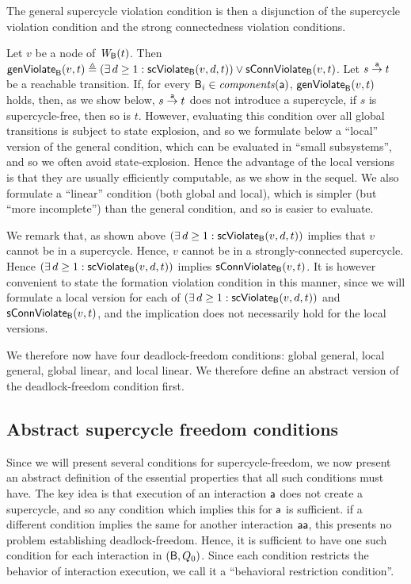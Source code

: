 The general supercycle violation condition is then a disjunction of the supercycle violation condition
and the strong connectedness violation conditions.


\label{def:formation.violation} 
\label{defn:formation.violation} 
Let $v$ be a node of $\wfg{\B}{t}$.
Then $\genViol{v}{t}  \df (\exs d \ge 1: \scViol{v}{d}{t}) \lor \connViol{v}{t}$.
\ed
%
Let $s \goesto[\act] t$ be a reachable transition. If, for every $\B_i \in \cmps{\act}$,
$\formViol{v}{t}$ holds, then, as we show below, $s \goesto[\act] t$ does not introduce a
supercycle, \ie if $s$ is supercycle-free, then so is $t$.  However, evaluating this condition over
all global transitions is subject to state explosion, and so we formulate below a ``local'' version
of the general condition, which can be evaluated in ``small subsystems'', and so we often avoid
state-explosion. Hence the advantage of the local versions is that they are usually efficiently
computable, as we show in the sequel.  We also formulate a ``linear'' condition (both global and
local), which is simpler (but ``more incomplete'') than the general condition, and so is easier to
evaluate.

We remark that, as shown above $(\exs d \ge 1: \scViol{v}{d}{t})$ implies that $v$ cannot be in a
supercycle. Hence, $v$ cannot be in a strongly-connected supercycle.  Hence
$(\exs d \ge 1: \scViol{v}{d}{t})$ implies $\connViol{v}{t}$. It is however convenient to state the
formation violation condition in this manner, since we will formulate a local version
for each of $(\exs d \ge 1: \scViol{v}{d}{t})$ and $\connViol{v}{t}$, and the implication does not
necessarily hold for the local versions. 

We therefore now have four deadlock-freedom conditions: global general, local general, 
global linear, and local linear. We therefore define an abstract version of 
the deadlock-freedom condition first.


\subsection{Abstract supercycle freedom conditions}

Since we will present several conditions for supercycle-freedom, we now present an abstract
definition of the essential properties that all such conditions must have.  The key idea is that
execution of an interaction $\act$ does not create a supercycle, and so any condition which implies 
this for $\act$ is sufficient. if a different condition implies the same for another interaction
$\actp$, this presents no problem \wrt establishing deadlock-freedom. Hence, it is sufficient to
have one such condition for each interaction in  $(\B,Q_0)$. Since each condition restricts the
behavior of interaction execution, we call it a ``behavioral restriction condition''.

